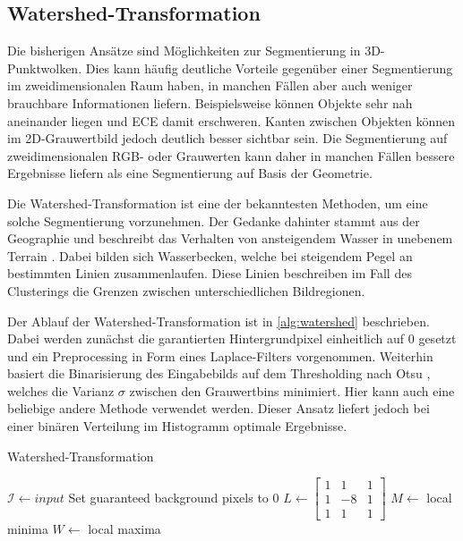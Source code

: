 \subsection{Watershed-Transformation}
\label{subsec:watershed}

Die bisherigen Ansätze sind Möglichkeiten zur Segmentierung in 3D-Punktwolken.
Dies kann häufig deutliche Vorteile gegenüber einer Segmentierung im zweidimensionalen Raum haben, in manchen Fällen aber auch weniger brauchbare Informationen liefern.
Beispielsweise können Objekte sehr nah aneinander liegen und \ac{ECE} damit erschweren.
Kanten zwischen Objekten können im 2D-Grauwertbild jedoch deutlich besser sichtbar sein.
Die Segmentierung auf zweidimensionalen RGB- oder Grauwerten kann daher in manchen Fällen bessere Ergebnisse liefern als eine Segmentierung auf Basis der Geometrie.

Die Watershed-Transformation ist eine der bekanntesten Methoden, um eine solche Segmentierung vorzunehmen.
Der Gedanke dahinter stammt aus der Geographie und beschreibt das Verhalten von ansteigendem Wasser in unebenem Terrain \cite[1--2]{roerdink2000watershed}.
Dabei bilden sich Wasserbecken, welche bei steigendem Pegel an bestimmten Linien zusammenlaufen.
Diese Linien beschreiben im Fall des Clusterings die Grenzen zwischen unterschiedlichen Bildregionen.

Der Ablauf der Watershed-Transformation ist in \autoref{alg:watershed} beschrieben.
Dabei werden zunächst die garantierten Hintergrundpixel einheitlich auf 0 gesetzt und ein Preprocessing in Form eines Laplace-Filters vorgenommen.
Weiterhin basiert die Binarisierung des Eingabebilds auf dem Thresholding nach Otsu \cite{otsu1979threshold}, welches die Varianz $\sigma$ zwischen den Grauwertbins minimiert.
Hier kann auch eine beliebige andere Methode verwendet werden. Dieser Ansatz liefert jedoch bei einer binären Verteilung im Histogramm optimale Ergebnisse.

\begin{algorithm}[H]
\caption[Watershed-Transformation]{Watershed-Transformation \cite{openCVwatershed}}
\label{alg:watershed}
\begin{algorithmic}
\State $\mathcal{I} \gets input$
\State Set guaranteed background pixels to $0$
\State $L \gets \begin{bmatrix}1 & 1 & 1\\1 & -8 & 1\\1 & 1 & 1\end{bmatrix}$
\State {}
\State {}
\State {}
\State $M \gets$ local minima
\State $W \gets$ local maxima
\State {}
	\State {}
\EndFor
\end{algorithmic}
\end{algorithm}



